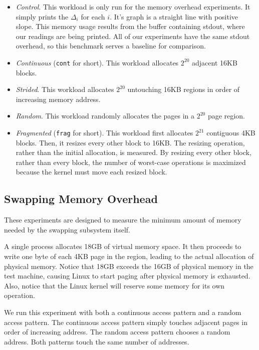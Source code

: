 \documentclass[twocolumn,11pt]{article}
\begin{document}
\begin{itemize} \item \textit{Control}. This workload is only run for the memory
overhead experiments. It simply prints the $\Delta_i$ for each $i$. It's graph
is a straight line with positive slope. This memory usage results from the
buffer containing stdout, where our readings are being printed. All of our
experiments have the same stdout overhead, so this benchmark serves a baseline
for comparison.

\item \textit{Continuous} (\texttt{cont} for short). This workload allocates $2^{20}$
adjacent 16KB blocks.

\item \textit{Strided}. This workload allocates $2^{20}$ untouching 16KB regions
in order of increasing memory address.

\item \textit{Random}. This workload randomly allocates the pages in a
$2^{20}$ page region.

\item \textit{Fragmented} (\texttt{frag} for short). This workload first allocates
    $2^{21}$ contiguous 4KB blocks. Then, it resizes every other block to 16KB.
        The resizing operation, rather than the initial allocation, is measured.
        By resizing every other block, rather than every block, the number of
        worst-case operations is maximized because the kernel must move each
        resized block.
\end{itemize}

\subsection{Swapping Memory Overhead}
\label{swapping_memory_overhead}

These experiments are designed to measure the minimum amount of memory needed
by the swapping subsystem itself.

A single process allocates 18GB of virtual memory space. It then proceeds to
write one byte of each 4KB page in the region, leading to the actual allocation
of physical memory. Notice that 18GB exceeds the 16GB of physical memory in the
test machine, causing Linux to start paging after physical memory is exhausted.
Also, notice that the Linux kernel will reserve some memory for its own
operation.

We run this experiment with both a continuous access pattern and a random access
pattern. The continuous access pattern simply touches adjacent pages in order of
increasing address. The random access pattern chooses a random address. Both
patterns touch the same number of addresses.
\end{document}
